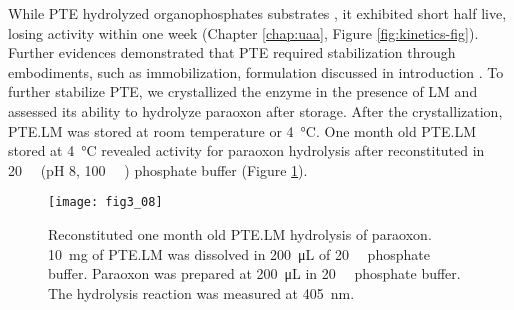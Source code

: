 \begin{refsection}
While PTE hydrolyzed organophosphates substrates \cite{Yang2014a,Baker2011b},
it exhibited short half live, losing activity within one week (Chapter
\ref{chap:uaa}, Figure \ref{fig:kinetics-fig}). Further evidences demonstrated
that PTE required stabilization through embodiments, such as immobilization,
formulation discussed in introduction
\cite{Chen1998,Gill2000,Havens1993,Masson2009a}. To further stabilize PTE, we
crystallized the enzyme in the presence of LM and assessed its ability to
hydrolyze paraoxon after storage. After the crystallization, PTE.LM was stored
at room temperature or \SI{4}{\celsius}. One month old PTE.LM stored at
\SI{4}{\celsius} revealed activity for paraoxon hydrolysis after reconstituted
in \SI{20}{\milli\Molar} (pH 8, \SI{100}{\micro\Molar} ) phosphate
buffer (Figure \ref{fig:ptelm-one-month}). 
\begin{figure}[htbp] \centering \texttt{[image: fig3\_08]}
    \caption[Reconstituted one month old PTE.LM hydrolysis of paraoxon.
        \SI{10}{\mg} of PTE.LM was dissolved in \SI{200}{\micro\liter} of
        \SI{20}{\milli\Molar} phosphate buffer. Paraoxon was prepared at
        \SI{200}{\micro\liter} in \SI{20}{\milli\Molar} phosphate buffer. The
    hydrolysis reaction was measured at \SI{405}{\nm}.] {Reconstituted one month
        old PTE.LM hydrolysis of paraoxon.  \SI{10}{\mg} of PTE.LM was
        dissolved in \SI{200}{\micro\liter} of \SI{20}{\milli\Molar} phosphate
        buffer.  Paraoxon was prepared at \SI{200}{\micro\liter} in
        \SI{20}{\milli\Molar} phosphate buffer. The hydrolysis reaction was
        measured at \SI{405}{\nm}.} 
        \label{fig:ptelm-one-month} 
\end{figure}


\end{refsection}
